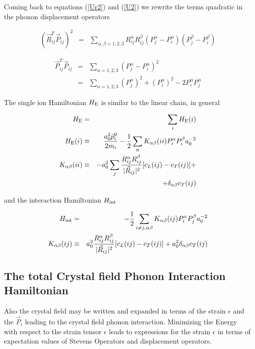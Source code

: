 Coming back to equations (\ref{Ur2}) and (\ref{U2}) we rewrite 
the terms quadratic in the phonon displacement operators 


\begin{eqnarray}
(\vec R_{ij}^T \vec P_{ij})^2&=&\sum_{\alpha,\beta=1,2,3} R_{ij}^{\alpha}R_{ij}^{\beta}(P_{j}^{\alpha}-P_{i}^{\alpha})(P_{j}^{\beta}-P_{i}^{\beta})  
\end{eqnarray}

\begin{eqnarray}
\vec P_{ij}^T \vec P_{ij}&=&\sum_{\alpha=1,2,3} (P_{j}^{\alpha}-P_{i}^{\alpha})^2 \nonumber \\
&=& \sum_{\alpha=1,2,3} (P_{j}^{\alpha})^2 +(P_{i}^{\alpha})^2- 2 P_{i}^{\alpha} P_{j}^{\alpha}
\end{eqnarray}



The single ion Hamiltonian $H_{\rm E}$ is similar to the linear chain, in general

\begin{eqnarray}
H_{\rm E}&=& \sum_{i} H_{\rm E}(i) \nonumber \\
 H_{\rm E}(i)&\equiv&\frac{a_0^2 \vec p_i^2}{2 m_i} -\frac{1}{2} 
\sum_{\alpha} K_{\alpha\beta}(ii) P_{i}^{\alpha}P_{i}^{\beta}a_0^{-2}   \\
K_{\alpha\beta}(ii)&\equiv& -a_0^2\sum_{j} \frac{R_{ij}^{\alpha}R_{ij}^{\beta}}{|\vec R_{ij}|^2} 
[c_L(ij)-c_T(ij)] + \nonumber \\
& & +  \delta_{\alpha\beta} c_T(ij)
\end{eqnarray}

and the interaction Hamiltonian  $H_{\rm int}$

\begin{eqnarray}
H_{\rm int}&=&-\frac{1}{2}\sum_{i\ne j,\alpha\beta} K_{\alpha\beta}(ij) P_{i}^{\alpha}P_{j}^{\beta}a_0^{-2}  \\
K_{\alpha\beta}(ij)&\equiv&a_0^2\frac{R_{ij}^{\alpha}R_{ij}^{\beta}}{|\vec R_{ij}|^2}[c_L(ij)-c_T(ij)]
+a_0^2\delta_{\alpha\beta}c_T(ij) \nonumber
\end{eqnarray}


\subsection{The total Crystal field Phonon Interaction Hamiltonian}

Also the crystal field may be written and expanded in terms of the strain $\epsilon$ and the 
$\vec P_i$ leading to the crystal field phonon interaction. Minimizing the Energy with respect to
the strain tensor $\epsilon$ leads to expressions for the strain $\epsilon$ in terms of expectation values
of Stevens Operators and displacement operators. 

